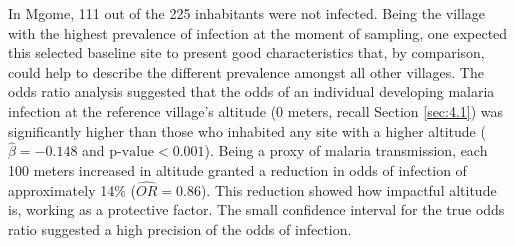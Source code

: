 In Mgome, 111 out of the 225 inhabitants were not infected.
Being the village with the highest prevalence of infection at the moment of sampling, one expected this selected baseline site to present good characteristics that, by comparison, could help to describe the different prevalence amongst all other villages.
The odds ratio analysis suggested that the odds of an individual developing malaria infection at the reference village's altitude (0 meters, recall Section \ref{sec:4.1}) was significantly higher than those who inhabited any site with a higher altitude ($\widehat{\beta}=−0.148$ and $\text{p-value}<0.001$).
Being a proxy of malaria transmission, each 100 meters increased in altitude granted a reduction in odds of infection of approximately 14\% ($\widehat{OR}=0.86$).
This reduction showed how impactful altitude is, working as a protective factor.
The small confidence interval for the true odds ratio suggested a high precision of the odds of infection.

